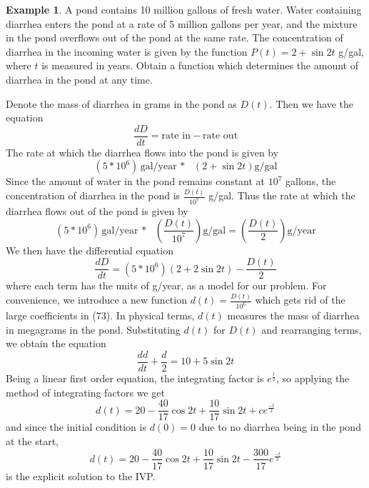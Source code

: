 \documentclass[11pt]{article}
\theoremstyle{definition}
\newtheorem{ex}{Example}
\begin{document}
\begin{ex}
    A pond contains 10 million gallons of fresh water. Water containing diarrhea enters the pond at a rate of 5 million gallons per year, and the mixture in the pond overflows out of the pond at the same rate. The concentration of diarrhea in the incoming water is given by the function $P(t) = 2 + \sin{2t}$ g/gal, where $t$ is measured in years. Obtain a function which determines the amount of diarrhea in the pond at any time.
\end{ex} Denote the mass of diarrhea in grams in the pond as $D(t)$. Then we have the equation \begin{equation}
    \frac{dD}{dt} = \text{rate in} - \text{rate out}
\end{equation} The rate at which the diarrhea flows into the pond is given by \begin{equation}
    (5 * 10^6)\text{gal/year $*$ }(2 + \sin{2t})\text{g/gal}
\end{equation} Since the amount of water in the pond remains constant at $10^7$ gallons, the concentration of diarrhea in the pond is $\frac{D(t)}{10^7}$ g/gal. Thus the rate at which the diarrhea flows out of the pond is given by  \begin{equation}
    (5 * 10^6)\text{gal/year $*$ }\left(\frac{D(t)}{10^7}\right)\text{g/gal} = \left(\frac{D(t)}{2}\right)\text{g/year}
\end{equation} We then have the differential equation \begin{equation}
    \frac{dD}{dt} = (5 * 10^6)(2 + 2\sin{2t}) - \frac{D(t)}{2}
\end{equation}where each term has the units of g/year, as a model for our problem. For convenience, we introduce a new function $d(t) = \frac{D(t)}{10^6}$ which gets rid of the large coefficients in (73). In physical terms, $d(t)$ measures the mass of diarrhea in megagrams in the pond. Substituting $d(t)$ for $D(t)$ and rearranging terms, we obtain the equation \begin{equation}
    \frac{dd}{dt} + \frac{d}{2} = 10 + 5\sin{2t}
\end{equation}Being a linear first order equation, the integrating factor is $e^{\frac{t}{2}}$, so applying the method of integrating factors we get \begin{equation}
    d(t) = 20 - \frac{40}{17}\cos{2t} + \frac{10}{17}\sin{2t} + ce^{\frac{-t}{2}}
\end{equation} and since the initial condition is $d(0) = 0$ due to no diarrhea being in the pond at the start,\begin{equation}
    d(t) = 20 - \frac{40}{17}\cos{2t} + \frac{10}{17}\sin{2t} - \frac{300}{17}e^{\frac{-t}{2}}
\end{equation}is the explicit solution to the IVP.\begin{figure}[h]
	\centering
\end{figure}
\end{document}
